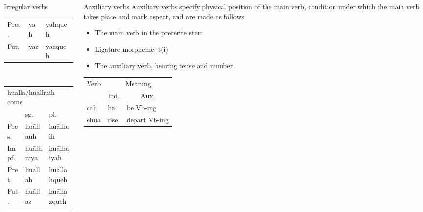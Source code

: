 \documentclass[12pt]{beamer}
\newcommand{\nah}[1]{\textcolor{nahgrn}{#1}}
\newcommand{\trs}[1]{\textcolor{nahblu}{#1}}
\begin{document}
\begin{frame}
\begin{columns}[t]
\begin{column}{.18\linewidth}
\begin{block}{Irregular verbs}
\begin{tabular}[t]{lll}
          Pret. & \nah{yah}  & \nah{yahqueh}           \\
          Fut.  & \nah{yāz}  & \nah{yāzqueh}           \\
        \end{tabular}%
        \\[1ex]
        \begin{tabular}[t]{lll}
          \multicolumn{3}{l}{\nah{huāllā/huālhuih} \trs{come}} \\
                & sg.             & pl.                        \\
          Pres. & \nah{huāllauh}  & \nah{huālhuih}             \\
          Impf. & \nah{huālhuiya} & \nah{huālhuiyah}           \\
          Pret. & \nah{huāllah}   & \nah{huāllahqueh}          \\
          Fut.  & \nah{huāllaz}   & \nah{huāllazqueh}          \\
        \end{tabular}%
      \end{block}
    \end{column}
    \begin{column}{.18\linewidth}
      \begin{block}{Auxiliary verbs}
        Auxiliary verbs specify physical position of the main verb, condition under which the main verb takes place and mark aspect, and are made as follows:
        \begin{itemize}
          \item The main verb in the preterite stem
          \item Ligature morpheme \nah{-t(i)-}
          \item The auxiliary verb, bearing tense and number
        \end{itemize}
        \begin{threeparttable}
          \begin{tabular}{lll}
            \multicolumn{1}{c}{Verb} & \multicolumn{2}{c}{Meaning}                            \\
                                     & \multicolumn{1}{c}{Ind.}    & \multicolumn{1}{c}{Aux.} \\
            \nah{cah}                & \trs{be}                    & \trs{be Vb-ing}          \\
            \nah{ēhua}               & \trs{rise}                  & \trs{depart   Vb-ing}    \\

\end{tabular}
\end{threeparttable}
\end{block}
\end{column}
\end{columns}
\end{frame}
\end{document}
